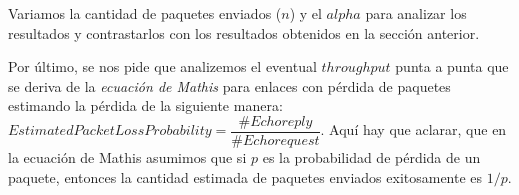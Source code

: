 \documentclass[final,inline,a4paper,narroweqnarray]{ieee}
\begin{document}
Variamos la cantidad de paquetes enviados ($n$) y el $alpha$ para analizar los resultados 
y contrastarlos con los resultados obtenidos en la sección anterior.

Por último, se nos pide que analizemos el eventual $throughput$ punta a punta que se deriva de la
\emph{ecuación de Mathis} para enlaces con pérdida de paquetes estimando la pérdida de la 
siguiente manera:
$EstimatedPacketLossProbability = \dfrac{\#Echo reply}{\#Echo request}$. Aquí hay que aclarar,
que en la ecuación de Mathis asumimos que si $p$ es la probabilidad de pérdida de un paquete,
entonces la cantidad estimada de paquetes enviados exitosamente es $1/p$.
\end{document}

